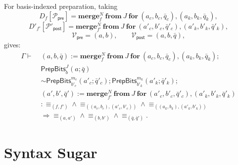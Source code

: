 \documentclass[acmsmall,screen,review,anonymous,nonacm]{acmart}
\theoremstyle{defn_style}
\begin{document}
For basis-indexed preparation, taking
\[
D_f[\mathcal P_{\mathsf{pre}}]
=
\mathbf{merge}_{f}^{N}\ \mathbf{from}\ J\
\mathbf{for}\
(a_c,b_c,\bar q_c),(a_k,b_k,\bar q_k),
\]
\[
D'_{f'}[\mathcal P'_{\mathsf{post}}]
=
\mathbf{merge}_{f'}^{N}\ \mathbf{from}\ J\
\mathbf{for}\
(a'_c,b'_c,\bar q'_c),(a'_k,b'_k,\bar q'_k),
\]
\[
\mathcal V_{\mathsf{pre}}=(a,b),
\qquad
\mathcal V_{\mathsf{post}}=(a,b,\bar q),
\]
gives:
\[
\begin{aligned}
\Gamma
\vdash\;&
(a,b,\bar q)
:=
\mathbf{merge}_{f}^{N}\ \mathbf{from}\ J\
\mathbf{for}\ (a_c,b_c,\bar q_c),(a_k,b_k,\bar q_k);
\\
&
\mathsf{PrepBits}^{J}_{b}(a;\bar q)
\\
&\sim
\mathsf{PrepBits}^{m_c}_{b'_c}(a'_c;\bar q'_c);
\mathsf{PrepBits}^{m_k}_{b'_k}(a'_k;\bar q'_k);
\\
&
(a',b',\bar q')
:=
\mathbf{merge}_{f'}^{N}\ \mathbf{from}\ J\
\mathbf{for}\ (a'_c,b'_c,\bar q'_c),(a'_k,b'_k,\bar q'_k)
\\
&:
\equiv_{(f,f')}
\land
\equiv_{((a_c,b_c),(a'_c,b'_c))}
\land
\equiv_{((a_k,b_k),(a'_k,b'_k))}
\\
&\Longrightarrow
\equiv_{(a,a')}
\land
\equiv_{(b,b')}
\land
\equiv_{(\bar q,\bar q')} .
\end{aligned}
\]


\section{Syntax Sugar}
\label{app:syntax-sugar}
\end{document}
